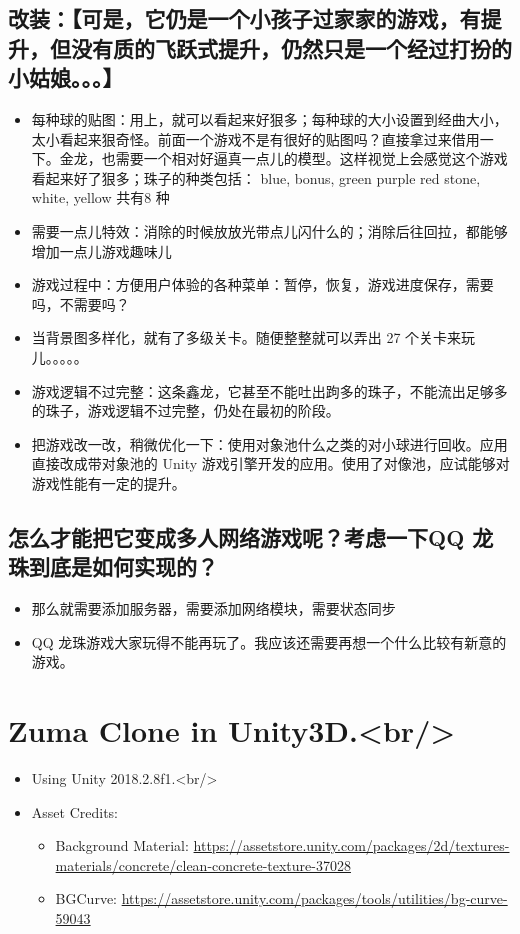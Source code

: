 \documentclass[9pt, b5paper]{article}
\begin{document}
\subsection{改装：【可是，它仍是一个小孩子过家家的游戏，有提升，但没有质的飞跃式提升，仍然只是一个经过打扮的小姑娘。。。】}
\label{sec-1-2}
\begin{itemize}
\item 每种球的贴图：用上，就可以看起来好狠多；每种球的大小设置到经曲大小，太小看起来狠奇怪。前面一个游戏不是有很好的贴图吗？直接拿过来借用一下。金龙，也需要一个相对好逼真一点儿的模型。这样视觉上会感觉这个游戏看起来好了狠多；珠子的种类包括： blue, bonus, green purple red stone, white, yellow 共有8 种
\item 需要一点儿特效：消除的时候放放光带点儿闪什么的；消除后往回拉，都能够增加一点儿游戏趣味儿
\item 游戏过程中：方便用户体验的各种菜单：暂停，恢复，游戏进度保存，需要吗，不需要吗？
\item 当背景图多样化，就有了多级关卡。随便整整就可以弄出 27 个关卡来玩儿。。。。。
\item 游戏逻辑不过完整：这条鑫龙，它甚至不能吐出跔多的珠子，不能流出足够多的珠子，游戏逻辑不过完整，仍处在最初的阶段。
\item 把游戏改一改，稍微优化一下：使用对象池什么之类的对小球进行回收。应用直接改成带对象池的 Unity 游戏引擎开发的应用。使用了对像池，应试能够对游戏性能有一定的提升。
\end{itemize}
\subsection{怎么才能把它变成多人网络游戏呢？考虑一下QQ 龙珠到底是如何实现的？}
\label{sec-1-3}
\begin{itemize}
\item 那么就需要添加服务器，需要添加网络模块，需要状态同步
\item QQ 龙珠游戏大家玩得不能再玩了。我应该还需要再想一个什么比较有新意的游戏。
\end{itemize}
\section{Zuma Clone in Unity3D.<br/>}
\label{sec-2}
\begin{itemize}
\item Using Unity 2018.2.8f1.<br/>
\item Asset Credits:
\begin{itemize}
\item Background Material: \url{https://assetstore.unity.com/packages/2d/textures-materials/concrete/clean-concrete-texture-37028}
\item BGCurve: \url{https://assetstore.unity.com/packages/tools/utilities/bg-curve-59043}
\end{itemize}
\end{itemize}
\end{document}
